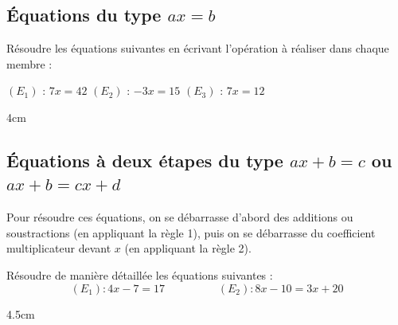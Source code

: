 \documentclass[a4paper]{book}
\begin{document}
    
\subsection{Équations du type $ax = b$} 
    \begin{exemple}
        Résoudre les équations suivantes en écrivant l'opération à réaliser dans chaque membre :
        
        $(E_1)$ : $7x = 42$ \hspace{2cm} $(E_2)$ : $-3x = 15$ \hspace{2cm} $(E_3)$ : $7x = 12$
        \begin{ZoneReponse}{4cm}
        \end{ZoneReponse}
    \end{exemple}

    
\subsection{Équations à deux étapes du type $ax + b = c$ ou $ax + b = cx+d$} 
    \begin{remarque}
        Pour résoudre ces équations, on se débarrasse d'abord des additions ou soustractions (en appliquant la règle 1), puis on se débarrasse du coefficient multiplicateur devant $x$ (en appliquant la règle 2).
    \end{remarque}
    
    
    \begin{exemple}
        Résoudre de manière détaillée les équations suivantes :
        \[ (E_1) : 4x - 7 = 17 \hspace{2cm} (E_2) : 8x - 10 = 3x + 20 \]
        \begin{ZoneReponse}{4.5cm}
        \end{ZoneReponse}
    \end{exemple}
\end{document}
